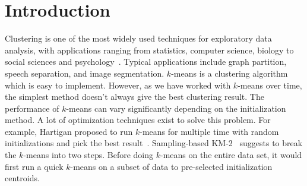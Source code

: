 \documentclass{acm_proc_article-sp}
\begin{document}


\section{Introduction}
Clustering is one of the most widely used techniques for exploratory data analysis,  with applications ranging from statistics, computer science, biology to social sciences and psychology~\cite{von2007tutorial}. Typical applications include graph partition, speech separation, and image segmentation. $k$-means is a  
clustering algorithm which is easy to implement. However, as we have worked with $k$-means over time, the simplest method doesn't always give the best clustering result. The performance of $k$-means can vary significantly depending on the initialization method. A lot of optimization techniques exist to solve this problem. For example, Hartigan proposed to run $k$-means for multiple time with random initializations and pick the best result~\cite{hartigan1979algorithm}. Sampling-based KM-2~\cite{yan2009fast} suggests to break the $k$-means into two steps. Before doing $k$-means on the entire data set, it would first run a quick $k$-means on a subset of data to pre-selected initialization centroids. 
\end{document}
